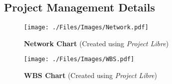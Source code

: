 \pagestyle{uselscape}
\begin{landscapes}
    \section{Project Management Details}

    
    \begin{figure}[H]
        \centering
        \texttt{[image: ./Files/Images/Network.pdf]}
        \caption{\textbf{Network Chart} {(Created using \textit{Project Libre})}}
    \end{figure}
    
    \newpage
    
    \begin{figure}[H]
        \centering
        \texttt{[image: ./Files/Images/WBS.pdf]}
        \caption{\textbf{\ac{WBS} Chart} {(Created using \textit{Project Libre})}}
    \end{figure}

\end{landscapes}
